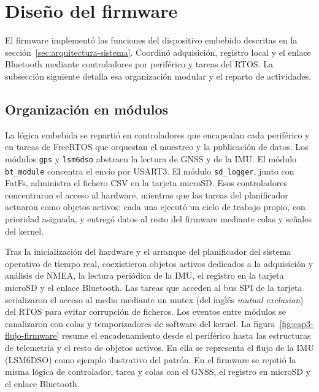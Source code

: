 \section{Diseño del firmware}
\label{sec:diseno-firmware}

El firmware implementó las funciones del dispositivo embebido descritas en la sección~\ref{sec:arquitectura-sistema}. Coordinó adquisición, registro local y el enlace Bluetooth mediante controladores por periférico y tareas del RTOS. La subsección siguiente detalla esa organización modular y el reparto de actividades.

\subsection{Organización en módulos}

La lógica embebida se repartió en controladores que encapsulan cada periférico y en tareas de FreeRTOS que orquestan el muestreo y la publicación de datos. Los módulos \texttt{gps} y \texttt{lsm6dso} abstraen la lectura de GNSS y de la IMU. El módulo \texttt{bt\_module} concentra el envío por USART3. El módulo \texttt{sd\_logger}, junto con FatFs, administra el fichero CSV en la tarjeta microSD. Esos controladores concentraron el acceso al hardware, mientras que las tareas del planificador actuaron como objetos activos: cada una ejecutó un ciclo de trabajo propio, con prioridad asignada, y entregó datos al resto del firmware mediante colas y señales del kernel.

Tras la inicialización del hardware y el arranque del planificador del sistema operativo de tiempo real, coexistieron objetos activos dedicados a la adquisición y análisis de NMEA, la lectura periódica de la IMU, el registro en la tarjeta microSD y el enlace Bluetooth. Las tareas que acceden al bus SPI de la tarjeta serializaron el acceso al medio mediante un mutex (del inglés \textit{mutual exclusion}) del RTOS para evitar corrupción de ficheros. Los eventos entre módulos se canalizaron con colas y temporizadores de software del kernel. La figura~\ref{fig:cap3-flujo-firmware} resume el encadenamiento desde el periférico hasta las estructuras de telemetría y el resto de objetos activos. En ella se representa el flujo de la IMU (LSM6DSO) como ejemplo ilustrativo del patrón. En el firmware se repitió la misma lógica de controlador, tarea y colas con el GNSS, el registro en microSD y el enlace Bluetooth.

